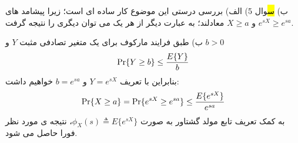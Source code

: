 \documentclass[10pt,letterpaper]{article}
\begin{document}
ب)
\hl
سوال 5)
 الف) بررسی درستی این موضوع کار ساده ای است؛ زیرا پیشامد های 
$
e^{sX}\ge e^{sa}
$
 و 
$
X\ge a
$
 معادلند؛ به عبارت دیگر از هر یک می توان دیگری را نتیجه گرفت.

ب) طبق فرایند مارکوف برای یک متغیر تصادفی مثبت $Y$ و $b>0$
$$
\Pr\{Y\ge b\}\le{E\{Y\}\over b}
$$
بنابراین با تعریف $Y=e^{sX}$ و $b=e^{sa}$ خواهیم داشت:
$$
\Pr\{X\ge a\}=\Pr\{e^{sX}\ge e^{sa}\}\le{E\{e^{sX}\}\over e^{sa}}
$$
به کمک تعریف تابع مولد گشتاور به صورت 
$
\phi_X(s)\triangleq E\{e^{sX}\}
$،
 نتیجه ی مورد نظر فورا حاصل می شود.
\end{document}
